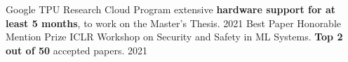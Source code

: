 
\begin{cvhonors}

  \cvhonor
    {Google TPU Research Cloud Program} %
    {extensive \textbf{hardware support for at least 5 months}, to work on the Master's Thesis.} %
    {} %
    {2021} %
  \cvhonor
    {Best Paper Honorable Mention Prize} %
    {ICLR Workshop on Security and Safety in ML Systems. \textbf{Top 2 out of 50} accepted papers.} %
    {} %
    {2021} %

\end{cvhonors}
